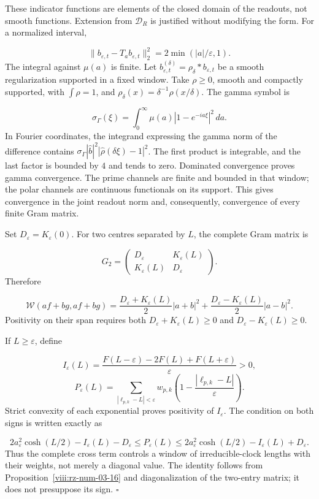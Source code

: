 These indicator functions are elements of the closed domain of the readouts, not smooth functions. Extension from \(\mathcal D_R\) is justified without modifying the form. For a normalized interval,

\[
\|b_{\varepsilon,t}-T_ab_{\varepsilon,t}\|_2^2
=2\min(|a|/\varepsilon,1).
\]
The integral against \(\mu(a)\) is finite. Let \(b_{\varepsilon,t}^{(\delta)}=\rho_\delta*b_{\varepsilon,t}\) be a smooth regularization supported in a fixed window. Take \(\rho\geq0\), smooth and compactly supported, with \(\int\rho=1\), and \(\rho_\delta(x)=\delta^{-1}\rho(x/\delta)\). The gamma symbol is

\[
\sigma_\Gamma(\xi)=\int_0^\infty
\mu(a)|1-e^{-ia\xi}|^2\,da.
\]
In Fourier coordinates, the integrand expressing the gamma norm of the difference contains \(\sigma_\Gamma|\widehat b|^2 |\widehat\rho(\delta\xi)-1|^2\). The first product is integrable, and the last factor is bounded by \(4\) and tends to zero. Dominated convergence proves gamma convergence. The prime channels are finite and bounded in that window; the polar channels are continuous functionals on its support. This gives convergence in the joint readout norm and, consequently, convergence of every finite Gram matrix.

Set \(D_\varepsilon=K_\varepsilon(0)\). For two centres separated by \(L\), the complete Gram matrix is

\[
G_2=\begin{pmatrix}D_\varepsilon&K_\varepsilon(L)\\
K_\varepsilon(L)&D_\varepsilon\end{pmatrix}.
\]
Therefore

\[
\mathscr W(af+bg,af+bg)=
\frac{D_\varepsilon+K_\varepsilon(L)}2|a+b|^2
+\frac{D_\varepsilon-K_\varepsilon(L)}2|a-b|^2.
\]
Positivity on their span requires both \(D_\varepsilon+K_\varepsilon(L)\geq0\) and \(D_\varepsilon-K_\varepsilon(L)\geq0\).

If \(L\geq\varepsilon\), define

\[
I_\varepsilon(L)=
\frac{F(L-\varepsilon)-2F(L)+F(L+\varepsilon)}{\varepsilon}>0,
\]
\[
P_\varepsilon(L)=
\sum_{|\ell_{p,k}-L|<\varepsilon}w_{p,k}
\left(1-\frac{|\ell_{p,k}-L|}{\varepsilon}\right).
\]
Strict convexity of each exponential proves positivity of \(I_\varepsilon\). The condition on both signs is written exactly as

\[
2a_\varepsilon^2\cosh(L/2)-I_\varepsilon(L)-D_\varepsilon
\leq P_\varepsilon(L)
\leq
2a_\varepsilon^2\cosh(L/2)-I_\varepsilon(L)+D_\varepsilon.
\]
Thus the complete cross term controls a window of irreducible-clock lengths with their weights, not merely a diagonal value. The identity follows from Proposition~\ref{viii:rz-num-03-16} and diagonalization of the two-entry matrix; it does not presuppose its sign. \hfill\(\square\)


